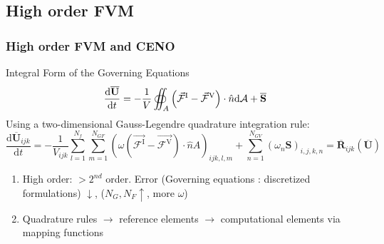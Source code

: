 \documentclass{beamer}
\begin{document}
\subsection{High order FVM}
\begin{frame}%
\frametitle{High order FVM and CENO}
\begin{minipage}[t][1\textheight]{1\textwidth}
\vspace{-20pt}
\tiny
\begin{block}{Integral Form of the Governing Equations}
\vspace{-5pt}
     \[
      \frac{\mathrm{d}\overline{\mathbf{U}}}{\mathrm{d}t} = 
      - \frac{1}{V} \oiint_A \left( \vec{\mathcal{F}}^{\rm I} - 
      \vec{\mathcal{F}}^{\rm V} \right) \cdot \hat{n} \mathrm{d}\mathcal{A} + 
      \overline{\mathbf{S}}
     \] 
    \vspace{-5pt} 
    Using a two-dimensional Gauss-Legendre quadrature integration rule:
    \[  \frac{\mathrm{d}\overline{\mathbf{U}}_{ijk}}{\mathrm{d}t} = -
       \frac{1}{{V}_{ijk}} \sum_{l=1}^{N_f}     
      \sum_{m=1}^{N_{GF}} \left( \omega \left(\vec{\mathcal{F}^{\mathrm{I}}} - 
      \vec{\mathcal{F}^{\mathrm{V}}} \right)\cdot \hat{n} {A} \right)_{ijk,l,m} 
      + \sum_{n=1}^{N_{GV}} \left( \omega_n {\mathbf{S}} \right)_{i,j,k,n}      
       = \overline{\mathbf{R}}_{ijk}  \left( \overline{\mathbf{U}} \right) \]
\vspace{-10pt} 
\end{block}
\vspace{-5pt}
\begin{enumerate}[1.]
\tiny
\item High order: $ > 2^{nd}$ order. Error (Governing equations : discretized formulations) $\downarrow$, ($N_G, N_F \uparrow$, more $\omega$)
\item Quadrature rules $\rightarrow$ reference elements $\rightarrow$ computational elements via mapping functions
\end{enumerate}
\vspace{-26pt}
\begin{figure}
\label{fig:h_order_error}
\hspace{-40pt}

\end{figure}
\end{minipage}
\end{frame}
\end{document}
